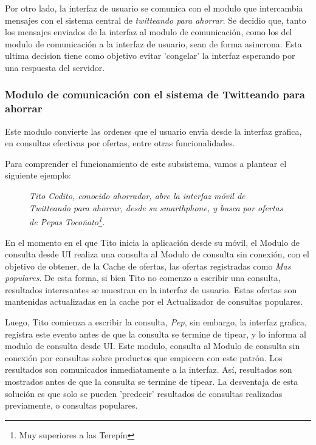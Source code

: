Por otro lado, la interfaz de usuario se comunica con el modulo que intercambia mensajes con el sistema central de \emph{twitteando para ahorrar}. Se decidio que, tanto los mensajes enviados de la interfaz al modulo de comunicación, como los del modulo de comunicación a la interfaz de usuario, sean de forma asincrona. Esta ultima decision tiene como objetivo evitar 'congelar' la interfaz esperando por una respuesta del servidor. 

\subsubsection{Modulo de comunicación con el sistema de Twitteando para ahorrar}

Este modulo convierte las ordenes que el usuario envia desde la interfaz grafica, en consultas efectivas por ofertas, entre otras funcionalidades. 

Para comprender el funcionamiento de este subsistema, vamos a plantear el siguiente ejemplo:

\begin{figure}[H]
	\centering
	\emph{Tito Codito, conocido ahorrador, abre la interfaz móvil de Twitteando para ahorrar, desde su smarthphone, y busca por ofertas de \emph{Pepas Tocoñato}\footnote{Muy superiores a las Terepín}.}
\end{figure}

En el momento en el que Tito inicia la aplicación desde su móvil, el \textsf{Modulo de consulta desde UI} realiza una consulta al \textsf{Modulo de consulta sin conexión}, con el objetivo de obtener, de la \textsf{Cache de ofertas}, las ofertas registradas como \emph{Mas populares}. De esta forma, si bien Tito no comenzo a escribir una consulta, resultados interesantes se muestran en la interfaz de usuario. Estas ofertas son mantenidas actualizadas en la cache por el \textsf{Actualizador de consultas populares}.

Luego, Tito comienza a escribir la consulta, \emph{Pep}, sin embargo, la interfaz grafica, registra este evento antes de que la consulta se termine de tipear, y lo informa al \textsf{modulo de consulta desde UI}. Este modulo, consulta al \textsf{Modulo de consulta sin conexión} por consultas sobre productos que empiecen con este patrón. Los resultados son comunicados inmediatamente a la interfaz. Así, resultados son mostrados antes de que la consulta se termine de tipear. La desventaja de esta solución es que solo se pueden 'predecir' resultados de consultas realizadas previamente, o consultas populares. 

